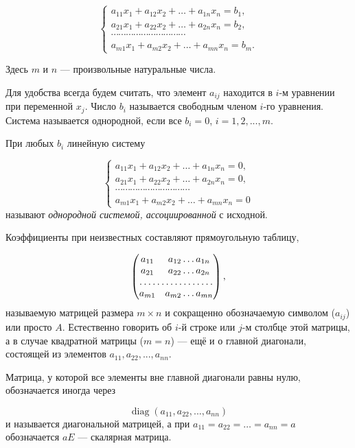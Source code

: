 \documentclass[12pt,english,russian]{article}
\DeclareMathOperator{\diag}{diag}
\begin{document}
	$$
		\begin{cases}
			a_{11}x_1 + a_{12}x_2 + \dots + a_{1n}x_n = b_1,\\
			a_{21}x_1 + a_{22}x_2 + \dots + a_{2n}x_n = b_2,\\
			\cdots \cdots \cdots \cdots \cdots \cdots \cdots \cdots \cdots \cdots\\
			a_{m1}x_1 + a_{m2}x_2 + \dots + a_{mn}x_n = b_m.
		\end{cases}
	$$

	Здесь $m$ и $n$ --- произвольные натуральные числа.

	Для удобства всегда будем считать, что элемент
	$a_{ij}$ находится в $i$-м уравнении при переменной $x_j$. 
	Число $b_i$ называется свободным членом $i$-го уравнения. Система называется
	однородной, если все $b_i = 0$, $i = 1, 2, . . . , m$.

	При любых $b_i$ линейную систему

	$$
		\begin{cases}
			a_{11}x_1 + a_{12}x_2 + \dots + a_{1n}x_n = 0,\\
			a_{21}x_1 + a_{22}x_2 + \dots + a_{2n}x_n = 0,\\
			\cdots \cdots \cdots \cdots \cdots \cdots \cdots \cdots \cdots \cdots\\
			a_{m1}x_1 + a_{m2}x_2 + \dots + a_{mn}x_n = 0
		\end{cases}
	$$
	называют
	\textit{однородной системой, ассоциированной}
	с исходной.

	Коэффициенты при неизвестных составляют прямоугольную
	таблицу,

	$$
			\begin{pmatrix}
				 a_{11} & a_{12} \dots a_{1n}\\
				 a_{21} & a_{22} \dots a_{2n}\\
				 \hdotsfor {2} \\
				 a_{m1} & a_{m2} \dots a_{mn}
			  \end{pmatrix},
	$$
	называемую матрицей размера $m \times n$ и сокращенно обозначаемую символом 
	($a_{ij}$) или просто $A$. Естественно говорить об $i$-й строке или $j$-м 
	столбце этой матрицы, а в случае квадратной матрицы ($m = n$) --- ещё и о главной диагонали, состоящей из
	элементов $a_{11}, a_{22}, . . . , a_{nn}$.

	Матрица, у которой все элементы вне главной диагонали равны
	нулю, обозначается иногда через

	$$\diag(a_{11}, a_{22}, . . . , a_{nn})$$
	и называется диагональной матрицей, а при $a_{11} = a_{22} = \dots = a_{nn} = a$
	обозначается $aE$ --- скалярная матрица.
\end{document}
